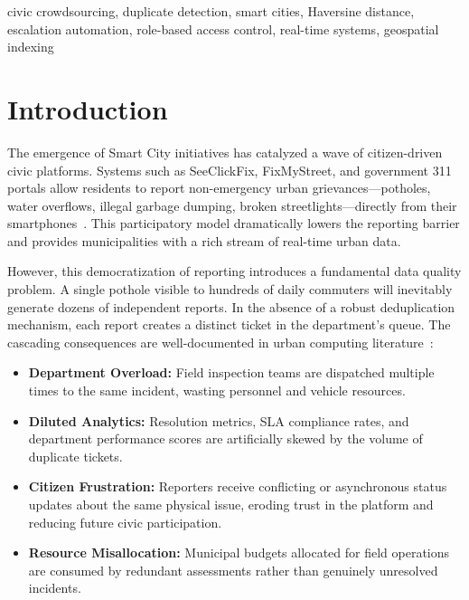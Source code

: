 \documentclass[conference]{IEEEtran}
\begin{document}
\begin{IEEEkeywords}
civic crowdsourcing, duplicate detection, smart cities, Haversine distance, escalation automation, role-based access control, real-time systems, geospatial indexing
\end{IEEEkeywords}

\section{Introduction}

The emergence of Smart City initiatives has catalyzed a wave of citizen-driven civic platforms. Systems such as SeeClickFix, FixMyStreet, and government 311 portals allow residents to report non-emergency urban grievances---potholes, water overflows, illegal garbage dumping, broken streetlights---directly from their smartphones~\cite{b1}. This participatory model dramatically lowers the reporting barrier and provides municipalities with a rich stream of real-time urban data.

However, this democratization of reporting introduces a fundamental data quality problem. A single pothole visible to hundreds of daily commuters will inevitably generate dozens of independent reports. In the absence of a robust deduplication mechanism, each report creates a distinct ticket in the department's queue. The cascading consequences are well-documented in urban computing literature~\cite{b2}:

\begin{itemize}
\item \textbf{Department Overload:} Field inspection teams are dispatched multiple times to the same incident, wasting personnel and vehicle resources.
\item \textbf{Diluted Analytics:} Resolution metrics, SLA compliance rates, and department performance scores are artificially skewed by the volume of duplicate tickets.
\item \textbf{Citizen Frustration:} Reporters receive conflicting or asynchronous status updates about the same physical issue, eroding trust in the platform and reducing future civic participation.
\item \textbf{Resource Misallocation:} Municipal budgets allocated for field operations are consumed by redundant assessments rather than genuinely unresolved incidents.
\end{itemize}
\end{document}
